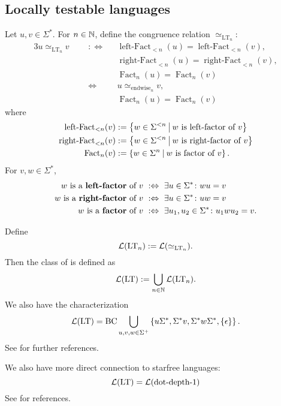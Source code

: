 \subsection{Locally testable languages}
\label{lang:LT}
Let $u,v \in \Sigma^*$. For $n \in \mathbb{N}$, define the congruence relation $\simeq_{\text{LT}_n}$:
\begin{alignat*}{3}
u \simeq_{\text{LT}_n} v \ \ \ && :\Leftrightarrow \ \ \ & \operatorname{left-Fact}_{<n}(u) = \operatorname{left-Fact}_{<n}(v) , \\
&&& \operatorname{right-Fact}_{<n}(u) = \operatorname{right-Fact}_{<n}(v) , \\
&&& \operatorname{Fact}_{n}(u) = \operatorname{Fact}_{n}(v) \\
&& \Leftrightarrow \ \ \ & u \simeq_{\text{endwise}_n} v , \\
&&& \operatorname{Fact}_n(u) = \operatorname{Fact}_n(v)
\end{alignat*}
where
\begin{align*}
\operatorname{left-Fact}_{<n}(v) & := \Set{w \in \Sigma^{<n}}{\text{$w$ is left-factor of $v$}} \\
\operatorname{right-Fact}_{<n}(v) & := \Set{w \in \Sigma^{<n}}{\text{$w$ is right-factor of $v$}} \\
\operatorname{Fact}_{n}(v) & := \Set{w \in \Sigma^{n}}{\text{$w$ is factor of $v$}}.
\end{align*}
For $v,w \in \Sigma^*$,
\begin{align*}
\text{$w$ is a \defword{left-factor} of $v$} & \ :\Leftrightarrow \ \exists u \in \Sigma^* \colon wu = v \\
\text{$w$ is a \defword{right-factor} of $v$} & \ :\Leftrightarrow \ \exists u \in \Sigma^* \colon uw = v \\
\text{$w$ is a \defword{factor} of $v$} & \ :\Leftrightarrow \ \exists u_1,u_2 \in \Sigma^* \colon u_1 w u_2 = v.
\end{align*}

Define
\[ \mathcal{L}(\textup{\textrm{LT}}_n) := \mathcal{L}(\simeq_{\text{LT}_n}) . \]
Then the class of  is defined as
\[ \mathcal{L}(\textup{\textrm{LT}}) := \bigcup_{n\in\mathbb{N}} \mathcal{L}(\textup{\textrm{LT}}_n) . \]
We also have the characterization
\[ \Lang(\LT) = \BC \bigcup_{u,v,w \in \Sigma^+} \Set{u\Sigma^*, \Sigma^* v, \Sigma^* w \Sigma^*, \Set{\epsilon}} . \]
See \cite[Section 2.5]{ConcHierR104} for further references.

We also have more direct connection to starfree languages:
\[ \mathcal{L}(\textup{\textrm{LT}}) = \mathcal{L}(\textup{\textrm{dot-depth-$1$}}) \]
See \cite{CharVarietiesKnast} for references.

